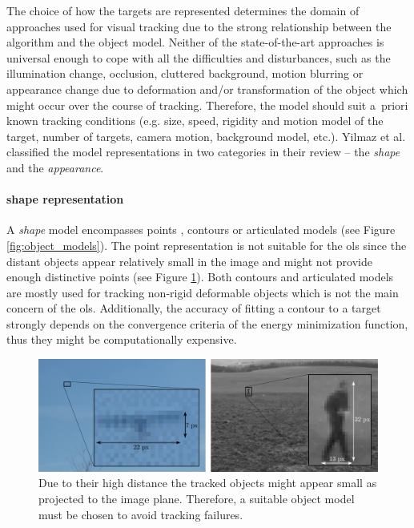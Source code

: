The choice of how the targets are represented determines the domain of approaches used for visual tracking due to the strong relationship between the algorithm and the object model. Neither of the state-of-the-art approaches is universal enough to cope with all the difficulties and disturbances, such as the illumination change, occlusion, cluttered background, motion blurring or appearance change due to deformation and/or transformation of the object \cite{Li:2013:SAM:2508037.2508039} which might occur over the course of tracking. Therefore, the model should suit a~priori known tracking conditions (e.g. size, speed, rigidity and motion model of the target, number of targets, camera motion, background model, etc.). Yilmaz et al. classified the model representations in two categories in their review \cite{Yilmaz:2006:OTS:1177352.1177355} -- the \textit{shape} and the \textit{appearance}. 


\paragraph{shape representation} 
A \textit{shape} model encompasses points \cite{Tomasi91detectionand}, contours \cite{Kass88snakes:active, ActiveContour-BasedVisualTracking} or articulated models \cite{Delamarre2001328, conf/isvc/MigniotA13} (see Figure \ref{fig:object_models}). The point representation is not suitable for the \gls{ols} since the distant objects appear relatively small in the image and might not provide enough distinctive points (see Figure \ref{fig:two_small_tracked_objects}). Both contours and articulated models are mostly used for tracking non-rigid deformable objects which is not the main concern of the \gls{ols}. Additionally, the accuracy of fitting a contour to a target strongly depends on the convergence criteria of the energy minimization function, thus they might be computationally expensive.

\begin{figure}[htb]\centering
	\centering
	\includegraphics[width=0.7\linewidth]{fig/two_small_tracked_objects.pdf}
	\caption{Due to their high distance the tracked objects might appear small as projected to the image plane. Therefore, a suitable object model must be chosen to avoid tracking failures.}
	\label{fig:two_small_tracked_objects}
\end{figure}

